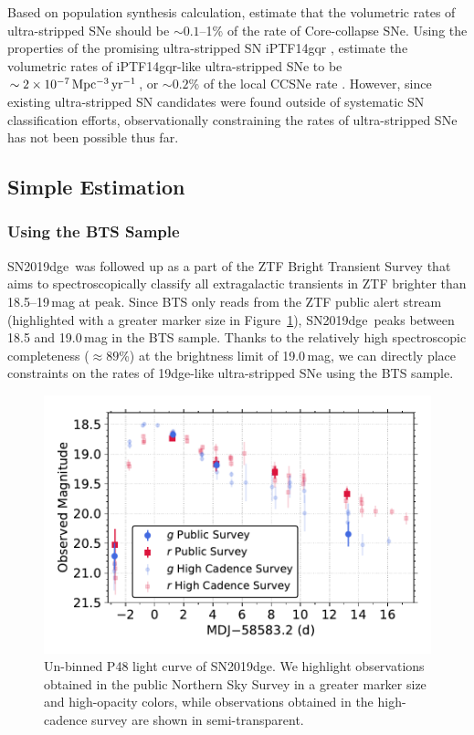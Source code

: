 \documentclass[twocolumn]{aastex63}
\newcommand{\name}{SN2019dge}
\begin{document}
\begin{CJK*}{UTF8}{gbsn}
Based on population synthesis calculation, \citet{Tauris2015} estimate 
that the volumetric rates of ultra-stripped SNe should be $\sim 0.1$--1\% of the rate of Core-collapse 
SNe. Using the properties of the promising ultra-stripped SN iPTF14gqr \citep{De2018}, 
\citet{Hijikawa2019} estimate the volumetric rates of iPTF14gqr-like ultra-stripped SNe to be $\sim 2 
\times 10^{-7}\,{\rm Mpc^{-3}\, yr^{-1}}$, or $\sim 0.2$\% of the local CCSNe rate 
\citep{Li2011a}. However, since existing ultra-stripped SN candidates were found outside of systematic 
SN classification efforts, observationally constraining the rates of ultra-stripped SNe has not been 
possible thus far. 

\subsection{Simple Estimation}
\subsubsection{Using the BTS Sample} \label{subsubsec:BTS}
\name\ was followed up as a part of the ZTF Bright Transient Survey 
\citep[BTS,][]{FremlingBTS2019} that aims to spectroscopically classify all extragalactic transients in 
ZTF brighter than 18.5--19\,mag at peak. Since BTS only reads from the ZTF public alert stream 
(highlighted with a greater marker size in Figure~\ref{fig:lc_pid}), \name\ peaks between 18.5 and 
19.0\,mag in the BTS sample. Thanks to the relatively high spectroscopic completeness ($\approx 
89$\%) at the brightness limit of 19.0\,mag, we can directly place constraints on the rates of 19dge-like 
ultra-stripped SNe using the BTS sample. 

\begin{figure}[htbp!]
	\centering
	\includegraphics[width=\columnwidth]{figures/lc_programids.pdf}
	\caption{Un-binned P48 light curve of \name. We highlight observations obtained in the public 
	Northern Sky Survey in a greater marker size and high-opacity colors, while observations obtained in 
	the high-cadence survey are shown in semi-transparent.
		\label{fig:lc_pid}}
\end{figure}


\end{CJK*}
\end{document}
